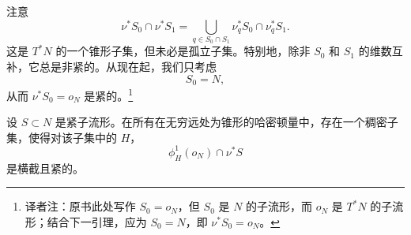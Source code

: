 注意
\[
  \nu^*S_0\cap\nu^*S_1
  =\bigcup_{q\in S_0\cap S_1}\nu_q^*S_0\cap\nu_q^*S_1.
\]
这是 $T^*N$ 的一个锥形子集，但未必是孤立子集。特别地，除非 $S_0$ 和 $S_1$ 的维数互补，它总是非紧的。从现在起，我们只考虑
\[
  S_0=N,
\]
从而 $\nu^*S_0=o_N$ 是紧的。\footnote{译者注：原书此处写作 $S_0=o_N$，但 $S_0$ 是 $N$ 的子流形，而 $o_N$ 是 $T^*N$ 的子流形；结合下一引理，应为 $S_0=N$，即 $\nu^*S_0=o_N$。}

\begin{lemma}
\label{lem:dense-conic-hamiltonians-transverse}
设 $S\subset N$ 是紧子流形。在所有在无穷远处为锥形的哈密顿量中，存在一个稠密子集，使得对该子集中的 $H$，
\[
  \phi_H^1(o_N)\cap\nu^*S
\]
是横截且紧的。
\end{lemma}
